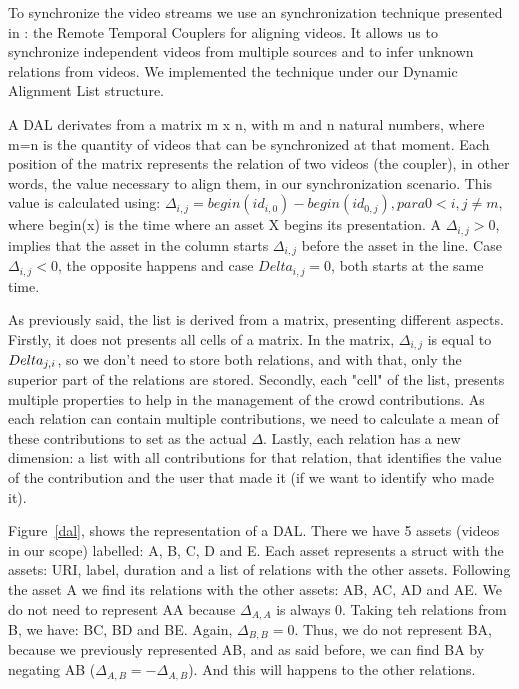 To synchronize the video streams we use an synchronization technique presented in \cite{segundo2015remote}: the Remote Temporal Couplers for aligning videos. It allows us to synchronize independent videos from multiple sources and to infer unknown relations from videos. We implemented the technique under our Dynamic Alignment List structure.

A DAL derivates from a matrix m x n, with m and n natural numbers, where m=n is the quantity of videos that can be synchronized at that moment. Each position of the matrix represents the relation of two videos (the coupler), in other words, the value necessary to align them, in our synchronization scenario. This value is calculated using: $\Delta_{i,j}=begin(id_{i,0})-begin(id_{0,j}), para 0<i,j\neq m $, where begin(x) is the time where an asset X begins its presentation. A $\Delta_{i,j} > 0$, implies that the asset in the column starts $\Delta_{i,j}$ before the asset in the line. Case $\Delta_{i,j} < 0$, the opposite happens and case $Delta_{i,j} = 0$, both starts at the same time.

As previously said, the list is derived from a matrix, presenting different aspects. Firstly, it does not presents all cells of a matrix. In the matrix, $\Delta_{i,j}$ is equal to $\-Delta_{j,i}$, so we don't need to store both relations, and with that, only the superior part of the relations are stored. Secondly, each "cell" of the list, presents multiple properties to help in the management of the crowd contributions. As each relation can contain multiple contributions, we need to calculate a mean of these contributions  to set as the actual $\Delta$. Lastly, each relation has a new dimension: a list with all contributions for that relation, that identifies the value of the contribution and the user that made it (if we want to identify who made it).

Figure~\ref{dal}, shows the representation of a DAL. There we have 5 assets (videos in our scope) labelled: A, B, C, D and E. Each asset represents a struct with the assets: URI, label, duration and a list of relations with the other assets. Following the asset A we find its relations with the other assets: AB, AC, AD and AE. We do not need to represent AA because $\Delta_{A,A}$ is always 0. Taking teh relations from B, we have: BC, BD and BE.  Again, $\Delta_{B,B} = 0$. Thus, we do not represent BA, because we previously represented AB, and as said before, we can find BA by negating AB ($\Delta_{A,B} = -\Delta_{A,B}$). And this will happens to the other relations.

